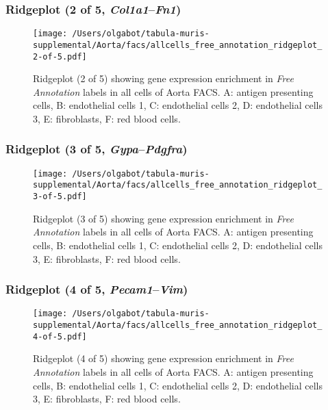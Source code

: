 \clearpage

\subsubsection{Ridgeplot (2 of 5, \emph{Col1a1}--\emph{Fn1})}
\begin{figure}[h]
\centering
\texttt{[image: /Users/olgabot/tabula-muris-supplemental/Aorta/facs/allcells\_free\_annotation\_ridgeplot\_2-of-5.pdf]}

\caption{ Ridgeplot (2 of 5)  showing gene expression enrichment in \emph{Free Annotation} labels in all cells of Aorta FACS. A: antigen presenting cells, B: endothelial cells 1, C: endothelial cells 2, D: endothelial cells 3, E: fibroblasts, F: red blood cells.}
\end{figure}


\clearpage

\subsubsection{Ridgeplot (3 of 5, \emph{Gypa}--\emph{Pdgfra})}
\begin{figure}[h]
\centering
\texttt{[image: /Users/olgabot/tabula-muris-supplemental/Aorta/facs/allcells\_free\_annotation\_ridgeplot\_3-of-5.pdf]}

\caption{ Ridgeplot (3 of 5)  showing gene expression enrichment in \emph{Free Annotation} labels in all cells of Aorta FACS. A: antigen presenting cells, B: endothelial cells 1, C: endothelial cells 2, D: endothelial cells 3, E: fibroblasts, F: red blood cells.}
\end{figure}


\clearpage

\subsubsection{Ridgeplot (4 of 5, \emph{Pecam1}--\emph{Vim})}
\begin{figure}[h]
\centering
\texttt{[image: /Users/olgabot/tabula-muris-supplemental/Aorta/facs/allcells\_free\_annotation\_ridgeplot\_4-of-5.pdf]}

\caption{ Ridgeplot (4 of 5)  showing gene expression enrichment in \emph{Free Annotation} labels in all cells of Aorta FACS. A: antigen presenting cells, B: endothelial cells 1, C: endothelial cells 2, D: endothelial cells 3, E: fibroblasts, F: red blood cells.}
\end{figure}


